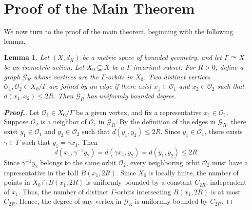 \documentclass[pdflatex]{sn-jnl}
\theoremstyle{plain}
\newtheorem{lemma}[theorem]{Lemma}
\theoremstyle{definition}
\begin{document}
\section{Proof of the Main Theorem}

We now turn to the proof of the main theorem, beginning with the following lemma.
\begin{lemma}\label{lemma 2.25}
Let $(X,d_X)$ be a metric space of bounded geometry, and let
$\Gamma\curvearrowright X$ be an isometric action. Let
$X_0\subseteq X$ be a $\Gamma$-invariant subset. For $R>0$, define a
graph $\mathcal{G}_{R}$ whose vertices are the $\Gamma$-orbits in
$X_0$. Two distinct vertices $\mathcal{O}_1,\mathcal{O}_2\in X_{0}/\Gamma$
are joined by an edge if there exist $x_1\in\mathcal{O}_1$ and
$x_2\in\mathcal{O}_2$ such that
$d(x_1,x_2)\leq 2R$.
Then $\mathcal{G}_R$ has uniformly bounded degree.
\end{lemma}
\begin{proof}[\textbf{Proof.}]\normalsize 
Let $\mathcal{O}_1\in X_0/\Gamma$ be a given vertex, and fix a representative $x_1\in\mathcal{O}_1$. Suppose $\mathcal{O}_2$ is a neighbor of $\mathcal{O}_1$ in $\mathcal{G}_R$. By the definition of the edges in $\mathcal{G}_R$, there exist $y_1\in\mathcal{O}_1$ and $y_2\in\mathcal{O}_2$ such that $d(y_1, y_2)\leq 2R$. Since $y_1\in\mathcal{O}_1$, there exists $\gamma\in \Gamma$ such that $y_1=\gamma x_1$. Then
\[d(x_1,\gamma^{-1}y_2)=d(\gamma x_1, y_2)=d(y_1, y_2)\leq 2R.\]
Since $\gamma^{-1}y_2$ belongs to the same orbit $\mathcal{O}_2$, every neighboring orbit $\mathcal{O}_2$ must have a representative in the ball $B(x_1,2R)$. Since $X_0$ is locally finite, the number of points in $X_0\cap B(x_1,2R)$ is uniformly bounded by a constant $C_{2R}$, independent of $x_1$. Thus, the number of distinct $\Gamma$-orbits intersecting $B(x_1,2R)$ is at most $C_{2R}$. Hence, the degree of any vertex in $\mathcal{G}_R$ is uniformly bounded by $C_{2R}$.
\end{proof}
\end{document}
